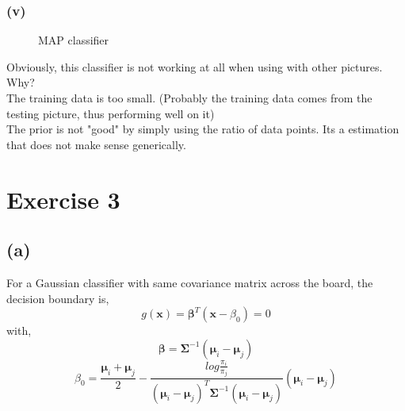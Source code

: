 \documentclass[11pt]{article}
\begin{document}
\subsubsection*{(v)}
\begin{figure}[h]
	\centering
	\caption{MAP classifier}
\end{figure}

\noindent Obviously, this classifier is not working at all when using with other pictures.\\
Why?\\
The training data is too small. (Probably the training data comes from the testing picture, thus performing well on it)\\
The prior is not "good" by simply using the ratio of data points. Its a estimation that does not make sense generically.

\pagebreak
\section*{Exercise 3}
\subsection*{(a)}
For a Gaussian classifier with same covariance matrix across the board, the decision boundary is,
$$g(\pmb{x}) = \pmb{\beta}^T(\pmb{x}-\beta_0)=0$$
with,
$$\pmb{\beta} = \pmb{\Sigma}^{-1}(\pmb{\mu}_i-\pmb{\mu}_j)$$
$$\beta_0=\frac{\pmb{\mu}_i+\pmb{\mu}_j}{2}-\frac{log\frac{\pi_i}{\pi_j}}{(\pmb{\mu}_i-\pmb{\mu}_j)^T\pmb{\Sigma}^{-1}(\pmb{\mu}_i-\pmb{\mu}_j)}(\pmb{\mu}_i-\pmb{\mu}_j)$$
\end{document}
